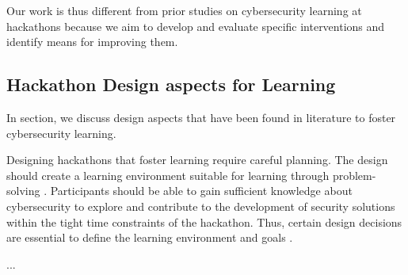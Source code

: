 \documentclass[runningheads]{llncs}
\begin{document}
Our work is thus different from prior studies on cybersecurity learning at hackathons because we aim to develop and evaluate specific interventions and identify means for improving them.

\subsection{Hackathon Design aspects for Learning}\label{Sec:designaspects}
In section, we discuss design aspects that have been found in literature to foster cybersecurity learning.

Designing hackathons that foster learning require careful planning. The design should create a learning environment suitable for learning through problem-solving \cite{case2004between}. Participants should be able to gain sufficient knowledge about cybersecurity to explore and contribute to the development of security solutions within the tight time constraints of the hackathon. Thus, certain design decisions are essential to define the learning environment and goals \cite{kollwitz2019hack}. 

...
\end{document}
